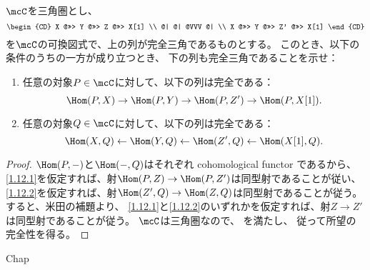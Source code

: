 \documentclass[uplatex,dvipdfmx]{jsarticle}
\begin{document}
\maketitle
\HeaderCommentA
\section{}
\fi



\begin{prob}\label{1.12}
  \(\mcC\)を三角圏とし、
  \[
  \begin{CD}
    X @>>> Y @>>> Z @>>> X[1] \\
    @| @| @VVV @| \\
    X @>>> Y @>>> Z' @>>> X[1]
  \end{CD}
  \]
  を\(\mcC\)の可換図式で、上の列が完全三角であるものとする。
  このとき、以下の条件のうちの一方が成り立つとき、
  下の列も完全三角であることを示せ：
  \begin{enumerate}
    \item \label{1.12.1}
    任意の対象\(P\in \mcC\)に対して、以下の列は完全である：
    \[
    \Hom(P,X) \to \Hom(P,Y) \to \Hom(P,Z') \to \Hom(P,X[1]).
    \]
    \item \label{1.12.2}
    任意の対象\(Q\in \mcC\)に対して、以下の列は完全である：
    \[
    \Hom(X,Q) \gets \Hom(Y,Q) \gets \Hom(Z',Q) \gets \Hom(X[1],Q).
    \]
  \end{enumerate}
\end{prob}


\begin{proof}
  \(\Hom(P,-)\)と\(\Hom(-,Q)\)はそれぞれ cohomological functor であるから、
  \ref{1.12.1}を仮定すれば、射\(\Hom(P,Z) \to \Hom(P,Z')\)は同型射であることが従い、
  \ref{1.12.2}を仮定すれば、射\(\Hom(Z',Q) \to \Hom(Z,Q)\)は同型射であることが従う。
  すると、米田の補題より、
  \ref{1.12.1}と\ref{1.12.2}のいずれかを仮定すれば、射\(Z\to Z'\)は同型射であることが従う。
  \(\mcC\)は三角圏なので、
  \cite[Proposition 1.4.4 (TR0)]{kashiwara2002sheaves}を満たし、
  従って所望の完全性を得る。
\end{proof}




\ifcsname Chap\endcsname\else
\printbibliography
\end{document}
